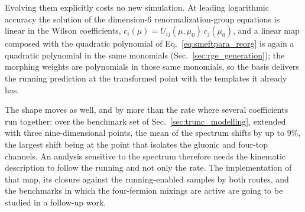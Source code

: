 Evolving them explicitly costs no new simulation. At leading logarithmic accuracy the
solution of the dimension-6 renormalization-group equations is linear in the Wilson
coefficients, $c_i(\mu) = U_{ij}(\mu,\mu_0)\,c_j(\mu_0)$, and a linear map composed with
the quadratic polynomial of Eq.~\eqref{eq:smeftpara_reorg} is again a quadratic
polynomial in the same monomials (Sec.~\ref{sec:rge_generation}); the morphing weights
are polynomials in those same monomials, so the basis delivers the running prediction at
the transformed point with the templates it already has.

The shape moves as well, and by more than the rate where several coefficients run
together: over the benchmark set of Sec.~\ref{sec:trunc_modelling}, extended with three
nine-dimensional points, the mean of the \mHH spectrum shifts by up to $9\%$, the
largest shift being at the point that isolates the gluonic and four-top channels. An
analysis sensitive to the spectrum therefore needs the kinematic description to follow
the running and not only the rate. The implementation of that map, its closure against
the running-enabled samples by both routes, and the benchmarks in which the four-fermion
mixings are active are going to be studied in a follow-up work.

